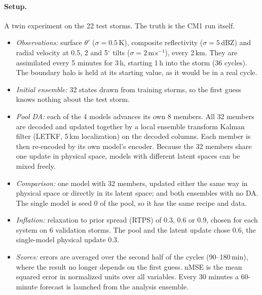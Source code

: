 \documentclass[11pt]{article}
\begin{document}
\paragraph{Setup.} A twin experiment on the 22 test storms. The truth is the CM1 run itself.
\begin{itemize}
\item \emph{Observations:} surface $\theta'$ ($\sigma = 0.5$\,K), composite reflectivity ($\sigma = 5$\,dBZ) and radial velocity at 0.5, 2 and 5$^\circ$ tilts ($\sigma = 2$\,m\,s$^{-1}$), every 2\,km. They are assimilated every 5 minutes for 3\,h, starting 1\,h into the storm (36 cycles). The boundary halo is held at its starting value, as it would be in a real cycle.
\item \emph{Initial ensemble:} 32 states drawn from training storms, so the first guess knows nothing about the test storm.
\item \emph{Pool DA:} each of the 4 models advances its own 8 members. All 32 members are decoded and updated together by a local ensemble transform Kalman filter (LETKF, 5\,km localization) on the decoded columns. Each member is then re-encoded by its own model's encoder. Because the 32 members share one update in physical space, models with different latent spaces can be mixed freely.
\item \emph{Comparison:} one model with 32 members, updated either the same way in physical space or directly in its latent space; and both ensembles with no DA. The single model is seed 0 of the pool, so it has the same recipe and data.
\item \emph{Inflation:} relaxation to prior spread (RTPS) of 0.3, 0.6 or 0.9, chosen for each system on 6 validation storms. The pool and the latent update chose 0.6, the single-model physical update 0.3.
\item \emph{Scores:} errors are averaged over the second half of the cycles (90--180\,min), where the result no longer depends on the first guess. nMSE is the mean squared error in normalized units over all variables. Every 30 minutes a 60-minute forecast is launched from the analysis ensemble.
\end{itemize}
\end{document}
